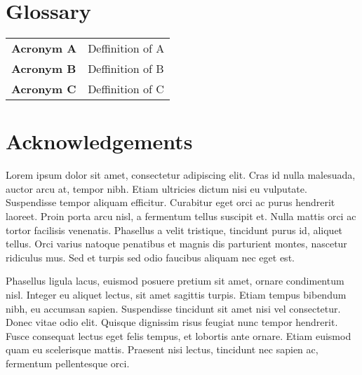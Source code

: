 \documentclass[]{article}
\numberwithin{equation}{section}
\begin{document}
\clearpage


\thispagestyle{empty}
\begin{singlespace}
\renewcommand{\cftsecleader}{\cftdotfill{\cftdotsep}}
\setcounter{tocdepth}{3}
\tableofcontents
\clearpage
{}
\listoftables
\clearpage
{}
\listoffigures
\clearpage
\end{singlespace}

\section*{Glossary}

\begin{tabu} to 
\toprule
Acronym A & Deffinition of A\\
Acronym B & Deffinition of B\\
Acronym C & Deffinition of C\\
\bottomrule
\end{tabu}

\clearpage

\section*{Acknowledgements}

Lorem ipsum dolor sit amet, consectetur adipiscing elit. Cras id nulla malesuada, auctor arcu at, tempor nibh. Etiam ultricies dictum nisi eu vulputate. Suspendisse tempor aliquam efficitur. Curabitur eget orci ac purus hendrerit laoreet. Proin porta arcu nisl, a fermentum tellus suscipit et. Nulla mattis orci ac tortor facilisis venenatis. Phasellus a velit tristique, tincidunt purus id, aliquet tellus. Orci varius natoque penatibus et magnis dis parturient montes, nascetur ridiculus mus. Sed et turpis sed odio faucibus aliquam nec eget est.

Phasellus ligula lacus, euismod posuere pretium sit amet, ornare condimentum nisl. Integer eu aliquet lectus, sit amet sagittis turpis. Etiam tempus bibendum nibh, eu accumsan sapien. Suspendisse tincidunt sit amet nisi vel consectetur. Donec vitae odio elit. Quisque dignissim risus feugiat nunc tempor hendrerit. Fusce consequat lectus eget felis tempus, et lobortis ante ornare. Etiam euismod quam eu scelerisque mattis. Praesent nisi lectus, tincidunt nec sapien ac, fermentum pellentesque orci.
\end{document}

